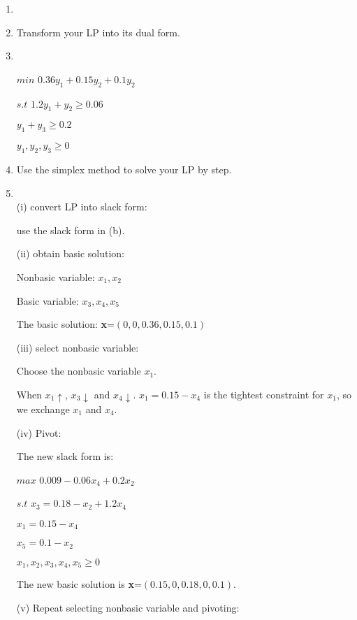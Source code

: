 \documentclass[12pt,a4paper]{article}
\makeatletter
\newtheorem*{solution}{Solution}
\theoremstyle{definition}
\renewenvironment{solution}[1][Solution] {\par\pushQED{\qed}\normalfont\topsep6\p@\@plus6\p@\relax\trivlist\item[\hskip\labelsep\bfseries#1\@addpunct{.}]\ignorespaces}{\popQED\endtrivlist\@endpefalse} \makeatother
\makeatother
\begin{document}
\begin{enumerate}
\begin{enumerate}
\begin{solution}
	\end{solution}
    \item
    Transform your LP into its dual form.
	\begin{solution}
		~\\
		\begin{center}
			$min$  $0.36y_1+0.15y_2+0.1y_2$
		
		$s.t$ $1.2y_1+y_2\ge0.06$
		
		$y_1+y_3\ge0.2$
		
		
		
		$y_1,y_2,y_3\ge0$
		\end{center}
	\end{solution}
    \item
    Use the simplex method to solve your LP by step.
    
    \begin{solution}
    	~\\
    	(i) convert LP into slack form:
    	
    	use the slack form in (b).
    	
    	(ii) obtain basic solution:
    	
    	Nonbasic variable: $x_1,x_2$
    	
    	Basic variable: $x_3,x_4,x_5$
    	
    	The basic solution: \textbf{x}=$(0,0,0.36,0.15,0.1)$
    	
    	(iii) select nonbasic variable:
    	
    	Choose the nonbasic variable $x_1$.
    	
    	When $x_1\uparrow$, $x_3\downarrow$ and $x_4\downarrow$. $x_1=0.15-x_4$ is the tightest constraint for $x_1$, so we exchange $x_1$ and $x_4$.
    	
    	(iv) Pivot:
    	
    	The new slack form is:
    	\begin{center}
    		$max$  $0.009-0.06x_4+0.2x_2$
    		
    		$s.t$ $x_3=0.18-x_2+1.2x_4$
    		
    		$x_1=0.15-x_4$
    		
    		$x_5=0.1-x_2$
    		
    		$x_1,x_2,x_3,x_4,x_5\ge0$
    	\end{center}
    
    	The new basic solution is \textbf{x}=$(0.15,0,0.18,0,0.1)$.
    	
    	(v) Repeat selecting nonbasic variable and pivoting:
    	

\end{solution}
\end{enumerate}
\end{enumerate}
\end{document}
